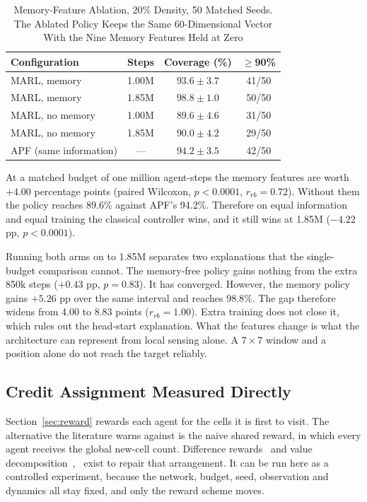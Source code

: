 \documentclass[a4paper, 10pt, conference]{ieeeconf}
\begin{document}
\begin{table}[htb]
\centering
\caption{Memory-Feature Ablation, 20\% Density, 50 Matched Seeds. The
Ablated Policy Keeps the Same 60-Dimensional Vector With the Nine
Memory Features Held at Zero}
\label{tab:ablation}
\scriptsize
\setlength{\tabcolsep}{3pt}
\begin{tabular}{lccc}
\toprule
\textbf{Configuration} & \textbf{Steps} & \textbf{Coverage (\%)} &
\textbf{$\geq$90\%} \\
\midrule
MARL, memory     & 1.00M & $93.6\pm3.7$ & 41/50 \\
MARL, memory     & 1.85M & $98.8\pm1.0$ & 50/50 \\
MARL, no memory  & 1.00M & $89.6\pm4.6$ & 31/50 \\
MARL, no memory  & 1.85M & $90.0\pm4.2$ & 29/50 \\
APF (same information) & --- & $94.2\pm3.5$ & 42/50 \\
\bottomrule
\end{tabular}
\end{table}

At a matched budget of one million agent-steps the memory features are
worth $+4.00$ percentage points (paired Wilcoxon, $p<0.0001$,
$r_{rb}=0.72$). Without them the policy reaches 89.6\% against APF's
94.2\%. Therefore on equal information and equal training the
classical controller wins, and it still wins at 1.85M ($-4.22$ pp,
$p<0.0001$).

Running both arms on to 1.85M separates two explanations that the
single-budget comparison cannot. The memory-free policy gains nothing
from the extra 850k steps ($+0.43$ pp, $p=0.83$). It has converged.
However, the memory policy gains $+5.26$ pp over the same interval and
reaches 98.8\%. The gap therefore widens from 4.00 to 8.83 points
($r_{rb}=1.00$). Extra training does not close it, which rules out the
head-start explanation. What the features change is what the
architecture can represent from local sensing alone. A $7\times7$
window and a position alone do not reach the target reliably.

\subsection{Credit Assignment Measured Directly}
\label{sec:credit}

Section~\ref{sec:reward} rewards each agent for the cells it is first
to visit. The alternative the literature warns against is the naive
shared reward, in which every agent receives the global new-cell
count. Difference rewards~\cite{foerster2018} and value
decomposition~\cite{sunehag2018},~\cite{rashid2018} exist to repair
that arrangement. It can be run here as a controlled experiment,
because the network, budget, seed, observation and dynamics all stay
fixed, and only the reward scheme moves.
\end{document}
